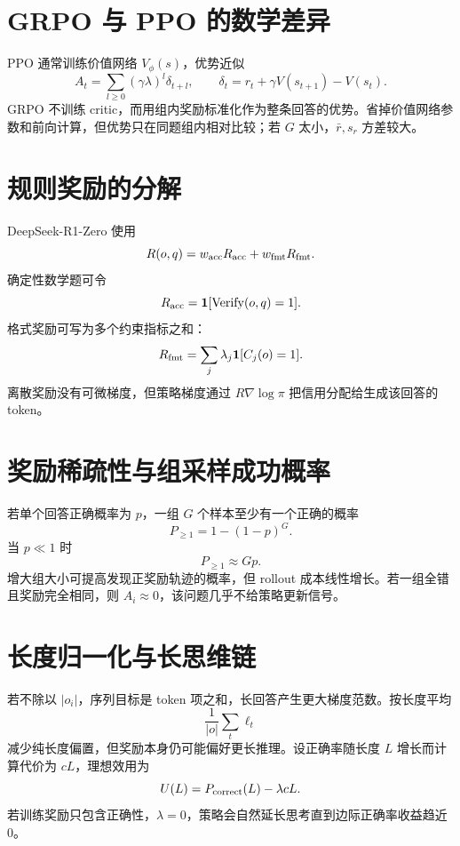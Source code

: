 \documentclass[UTF8,12pt,a4paper,fontset=none]{ctexart}
\numberwithin{equation}{section}
\begin{document}
\section{GRPO 与 PPO 的数学差异}
PPO 通常训练价值网络 $V_\phi(s)$，优势近似
\begin{equation}
 A_t=\sum_{l\ge0}(\gamma\lambda)^l\delta_{t+l},
 \qquad \delta_t=r_t+\gamma V(s_{t+1})-V(s_t).
\end{equation}
GRPO 不训练 critic，而用组内奖励标准化作为整条回答的优势。省掉价值网络参数和前向计算，但优势只在同题组内相对比较；若 $G$ 太小，$\bar r,s_r$ 方差较大。

\section{规则奖励的分解}
DeepSeek-R1-Zero 使用
\begin{equation}
 R(o,q)=w_{\rm acc}R_{\rm acc}+w_{\rm fmt}R_{\rm fmt}.
\end{equation}
确定性数学题可令
\begin{equation}
 R_{\rm acc}=\mathbf1[\operatorname{Verify}(o,q)=1].
\end{equation}
格式奖励可写为多个约束指标之和：
\begin{equation}
 R_{\rm fmt}=\sum_j\lambda_j\mathbf1[C_j(o)=1].
\end{equation}
离散奖励没有可微梯度，但策略梯度通过 $R\nabla\log\pi$ 把信用分配给生成该回答的 token。

\section{奖励稀疏性与组采样成功概率}
若单个回答正确概率为 $p$，一组 $G$ 个样本至少有一个正确的概率
\begin{equation}
 P_{\ge1}=1-(1-p)^G.
\end{equation}
当 $p\ll1$ 时
\begin{equation}
 P_{\ge1}\approx Gp.
\end{equation}
增大组大小可提高发现正奖励轨迹的概率，但 rollout 成本线性增长。若一组全错且奖励完全相同，则 $A_i\approx0$，该问题几乎不给策略更新信号。

\section{长度归一化与长思维链}
若不除以 $|o_i|$，序列目标是 token 项之和，长回答产生更大梯度范数。按长度平均
\begin{equation}
 \frac1{|o|}\sum_t\ell_{t}
\end{equation}
减少纯长度偏置，但奖励本身仍可能偏好更长推理。设正确率随长度 $L$ 增长而计算代价为 $cL$，理想效用为
\begin{equation}
 U(L)=P_{\rm correct}(L)-\lambda cL.
\end{equation}
若训练奖励只包含正确性，$\lambda=0$，策略会自然延长思考直到边际正确率收益趋近 0。
\end{document}
